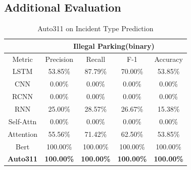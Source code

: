 \subsection{Additional Evaluation} 

\begin{table}[]
\footnotesize
\begin{tabular}{||c|cccc||}
\hline
          & \multicolumn{4}{c||}{Illegal Parking(binary)}                                                                                                 \\ \hline\hline
Metric    & \multicolumn{1}{c|}{Precision}         & \multicolumn{1}{c|}{Recall}            & \multicolumn{1}{c|}{F-1}               & Accuracy          \\ \hline
LSTM      & \multicolumn{1}{c|}{53.85\%}           & \multicolumn{1}{c|}{87.79\%}           & \multicolumn{1}{c|}{70.00\%}           & 53.85\%           \\ \hline
CNN       & \multicolumn{1}{c|}{0.00\%}                 & \multicolumn{1}{c|}{0.00\%}                 & \multicolumn{1}{c|}{0.00\%}                 & 0.00\%                 \\ \hline
RCNN      & \multicolumn{1}{c|}{0.00\%}                 & \multicolumn{1}{c|}{0.00\%}                 & \multicolumn{1}{c|}{0.00\%}                 & 0.00\%                 \\ \hline
RNN       & \multicolumn{1}{c|}{25.00\%}           & \multicolumn{1}{c|}{28.57\%}           & \multicolumn{1}{c|}{26.67\%}           & 15.38\%           \\ \hline
Self-Attn & \multicolumn{1}{c|}{0.00\%}                 & \multicolumn{1}{c|}{0.00\%}                 & \multicolumn{1}{c|}{0.00\%}                 & 0.00\%                 \\ \hline
Attention & \multicolumn{1}{c|}{55.56\%}           & \multicolumn{1}{c|}{71.42\%}           & \multicolumn{1}{c|}{62.50\%}           & 53.85\%           \\ \hline
Bert      & \multicolumn{1}{c|}{100.00\%} & \multicolumn{1}{c|}{100.00\%} & \multicolumn{1}{c|}{100.00\%} & 100.00\% \\ \hline
\textbf{Auto311}   & \multicolumn{1}{c|}{\textbf{100.00\%}} & \multicolumn{1}{c|}{\textbf{100.00\%}} & \multicolumn{1}{c|}{\textbf{100.00\%}} & \textbf{100.00\%} \\ \hline
\end{tabular}
\label{table:rest_eval}
\caption{Auto311 on Incident Type Prediction}
\end{table}

